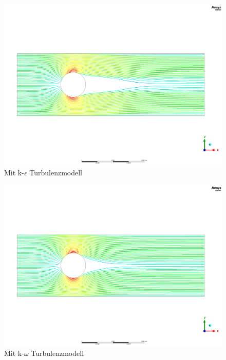 \begin{refsection}
\begin{figure}
    \includegraphics[width=\textwidth]{papers/reynolds/images/k-e.png}
    \caption{Mit k-$\epsilon$ Turbulenzmodell}
    \label{fig:k-e}
\end{figure}

\begin{figure}
    \includegraphics[width=\textwidth]{papers/reynolds/images/k-w.png}
    \caption{Mit k-$\omega$ Turbulenzmodell}
    \label{fig:k-w}
\end{figure}


\end{refsection}
